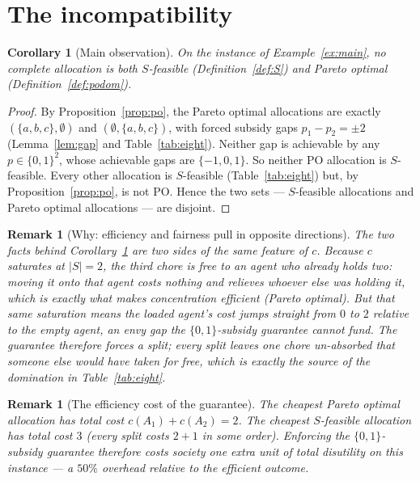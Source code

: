 \documentclass[11pt]{article}
\newtheorem{remark}[definition]{Remark}
\newtheorem{corollary}[definition]{Corollary}
\begin{document}
\section{The incompatibility}
\label{sec:incompat}

\begin{corollary}[Main observation]
\label{cor:main}
On the instance of Example~\ref{ex:main}, no complete allocation is both
$S$-feasible (Definition~\ref{def:S}) and Pareto optimal
(Definition~\ref{def:podom}).
\end{corollary}

\begin{proof}
By Proposition~\ref{prop:po}, the Pareto optimal allocations are exactly
$(\{a,b,c\},\emptyset)$ and $(\emptyset,\{a,b,c\})$, with forced subsidy gaps
$p_1-p_2 = \pm 2$ (Lemma~\ref{lem:gap} and Table~\ref{tab:eight}). Neither gap
is achievable by any $p \in \{0,1\}^2$, whose achievable gaps are
$\{-1,0,1\}$. So neither PO allocation is $S$-feasible. Every other
allocation is $S$-feasible (Table~\ref{tab:eight}) but, by
Proposition~\ref{prop:po}, is not PO. Hence the two sets --- $S$-feasible
allocations and Pareto optimal allocations --- are disjoint.
\end{proof}

\begin{remark}[Why: efficiency and fairness pull in opposite directions]
The two facts behind Corollary~\ref{cor:main} are two sides of the same
feature of $c$. Because $c$ saturates at $|S|=2$, the third chore is
\emph{free} to an agent who already holds two: moving it onto that agent
costs nothing and relieves whoever else was holding it, which is exactly what
makes concentration efficient (Pareto optimal). But that same saturation
means the loaded agent's cost jumps straight from $0$ to $2$ relative to the
empty agent, an envy gap the $\{0,1\}$-subsidy guarantee cannot fund. The
guarantee therefore forces a split; every split leaves one chore un-absorbed
that someone else would have taken for free, which is exactly the source of
the domination in Table~\ref{tab:eight}.
\end{remark}

\begin{remark}[The efficiency cost of the guarantee]
The cheapest Pareto optimal allocation has total cost $c(A_1)+c(A_2) = 2$.
The cheapest $S$-feasible allocation has total cost $3$ (every split costs
$2+1$ in some order). Enforcing the $\{0,1\}$-subsidy guarantee therefore
costs society one extra unit of total disutility on this instance --- a
$50\%$ overhead relative to the efficient outcome.
\end{remark}
\end{document}

